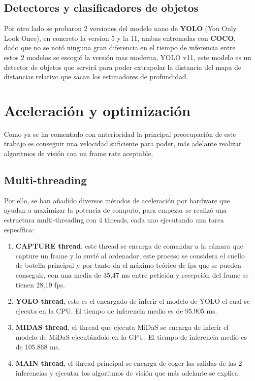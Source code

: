         \subsection{Detectores y clasificadores de objetos}
Por otro lado se probaron 2 versiones del modelo nano de \textbf{YOLO} (You Only Look Once), en concreto la version 5 y la 11, ambas entrenadas con \textbf{COCO}, dado que no se notó ninguna gran diferencia en el tiempo de inferencia entre estos 2 modelos se escogió la versión mas moderna, YOLO v11, este modelo es un detector de objetos que servirá para poder extrapolar la distancia del mapa de distancias relativo que sacan los estimadores de profundidad.
    \section{Aceleración y optimización}
Como ya se ha comentado con anterioridad la principal preocupación de este trabajo es conseguir una velocidad suficiente para poder, más adelante realizar algoritmos de visión con un frame rate aceptable. 

        \subsection{Multi-threading}
Por ello, se han añadido diversos métodos de aceleración por hardware que ayudan a maximizar la potencia de computo, para empezar se realizó una estructura multi-threading con 4 threads, cada uno ejecutando una tarea específica:

\begin{enumerate}
    \item \textbf{CAPTURE thread}, este thread se encarga de comandar a la cámara que capture un frame y lo envié al ordenador, este proceso se considera el cuello de botella principal y por tanto da el máximo teórico de fps que se pueden conseguir, con una media de 35,47 ms entre petición y recepción del frame se tienen 28,19 fps.
    \item \textbf{YOLO thread}, este es el encargado de inferir el modelo de YOLO el cual se ejecuta en la CPU. El tiempo de inferencia medio es de 95.905 ms.
    \item \textbf{MIDAS thread}, el thread que ejecuta MiDaS se encarga de inferir el modelo de MiDaS ejecutándolo en la GPU. El tiempo de inferencia medio es de 105.868 ms.
    \item \textbf{MAIN thread}, el thread principal se encarga de coger las salidas de las 2 inferencias y ejecutar los algoritmos de visión que más adelante se explica.
\end{enumerate}

